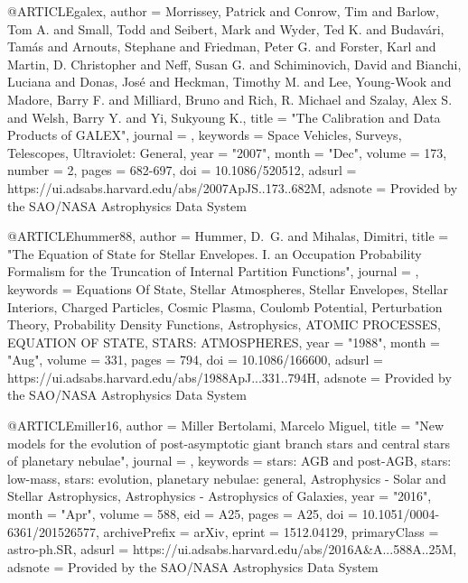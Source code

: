 \documentclass[a4paper,fleqn,usenatbib]{mnras}
\begin{document}
@ARTICLE{galex,
       author = {{Morrissey}, Patrick and {Conrow}, Tim and {Barlow}, Tom A. and
         {Small}, Todd and {Seibert}, Mark and {Wyder}, Ted K. and
         {Budav{\'a}ri}, Tam{\'a}s and {Arnouts}, Stephane and
         {Friedman}, Peter G. and {Forster}, Karl and {Martin}, D. Christopher and
         {Neff}, Susan G. and {Schiminovich}, David and {Bianchi}, Luciana and
         {Donas}, Jos{\'e} and {Heckman}, Timothy M. and {Lee}, Young-Wook and
         {Madore}, Barry F. and {Milliard}, Bruno and {Rich}, R. Michael and
         {Szalay}, Alex S. and {Welsh}, Barry Y. and {Yi}, Sukyoung K.},
        title = "{The Calibration and Data Products of GALEX}",
      journal = {\apjs},
     keywords = {Space Vehicles, Surveys, Telescopes, Ultraviolet: General},
         year = "2007",
        month = "Dec",
       volume = {173},
       number = {2},
        pages = {682-697},
          doi = {10.1086/520512},
       adsurl = {https://ui.adsabs.harvard.edu/abs/2007ApJS..173..682M},
      adsnote = {Provided by the SAO/NASA Astrophysics Data System}
}

@ARTICLE{hummer88,
       author = {{Hummer}, D.~G. and {Mihalas}, Dimitri},
        title = "{The Equation of State for Stellar Envelopes. I. an Occupation Probability Formalism for the Truncation of Internal Partition Functions}",
      journal = {\apj},
     keywords = {Equations Of State, Stellar Atmospheres, Stellar Envelopes, Stellar Interiors, Charged Particles, Cosmic Plasma, Coulomb Potential, Perturbation Theory, Probability Density Functions, Astrophysics, ATOMIC PROCESSES, EQUATION OF STATE, STARS: ATMOSPHERES},
         year = "1988",
        month = "Aug",
       volume = {331},
        pages = {794},
          doi = {10.1086/166600},
       adsurl = {https://ui.adsabs.harvard.edu/abs/1988ApJ...331..794H},
      adsnote = {Provided by the SAO/NASA Astrophysics Data System}
}



@ARTICLE{miller16,
       author = {{Miller Bertolami}, Marcelo Miguel},
        title = "{New models for the evolution of post-asymptotic giant branch stars and central stars of planetary nebulae}",
      journal = {\aap},
     keywords = {stars: AGB and post-AGB, stars: low-mass, stars: evolution, planetary nebulae: general, Astrophysics - Solar and Stellar Astrophysics, Astrophysics - Astrophysics of Galaxies},
         year = "2016",
        month = "Apr",
       volume = {588},
          eid = {A25},
        pages = {A25},
          doi = {10.1051/0004-6361/201526577},
archivePrefix = {arXiv},
       eprint = {1512.04129},
 primaryClass = {astro-ph.SR},
       adsurl = {https://ui.adsabs.harvard.edu/abs/2016A&A...588A..25M},
      adsnote = {Provided by the SAO/NASA Astrophysics Data System}
}
\end{document}
